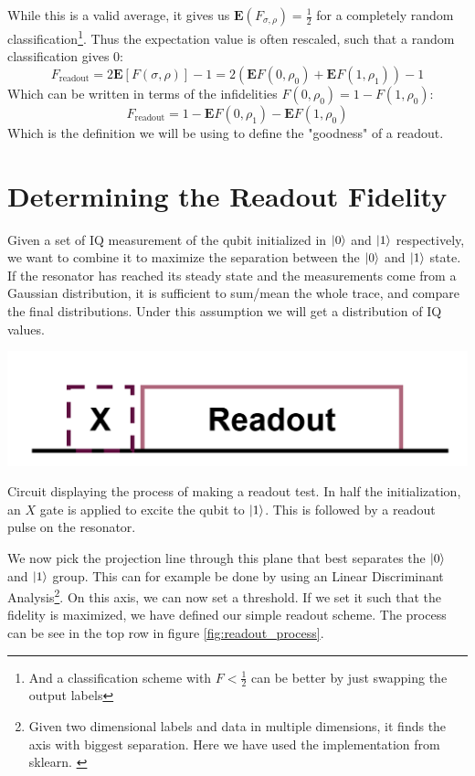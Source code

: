 While this is a valid average, it gives us $\mathbf{E}(F_{\sigma, \rho}) = \frac12$ for a completely random classification\footnote{And a classification scheme with $F<\frac12$ can be better by just swapping the output labels}. Thus the expectation value is often rescaled, such that a random classification gives $0$:
\begin{equation}
    F_{\text{readout}} = 2 \mathbf{E}\left[F(\sigma, \rho)\right] - 1 = 2 ( \mathbf{E}F(0, \rho_0) + \mathbf{E}F(1, \rho_1) ) - 1 
\end{equation}
Which can be written in terms of the infidelities $F(0, \rho_0) = 1 - F(1, \rho_0)$:
\begin{equation}
    F_{\text{readout}} = 1 - \mathbf{E}F(0, \rho_1) - \mathbf{E}F(1, \rho_0)
\end{equation}
Which is the definition we will be using to define the "goodness" of a readout. 

\section{Determining the Readout Fidelity}
Given a set of IQ measurement of the qubit initialized in $\ket{0}$ and $\ket{1}$ respectively, we want to combine it to maximize the separation between the $\ket{0}$ and $\ket{1}$ state. If the resonator has reached its steady state and the measurements come from a Gaussian distribution, it is sufficient to sum/mean the whole trace, and compare the final distributions. Under this assumption we will get a distribution of IQ values. 

\begin{marginfigure}
    \centering
    \includegraphics[]{Figs/circuits/readout_test.png}
    \caption{Circuit displaying the process of making a readout test. In half the initialization, an $X$ gate is applied to excite the qubit to $\ket{1}$. This is followed by a readout pulse on the resonator.}
    \label{fig:circuit_qubit_readout_test}
\end{marginfigure}

We now pick the projection line through this plane that best separates the $\ket{0}$ and $\ket{1}$ group. This can for example be done by using an Linear Discriminant Analysis\footnote{Given two dimensional labels and data in multiple dimensions, it finds the axis with biggest separation. Here we have used the implementation from sklearn. \cite{sklearn}}. On this axis, we can now set a threshold. If we set it such that the fidelity is maximized, we have defined our simple readout scheme. The process can be see in the top row in figure \ref{fig:readout_process}.

